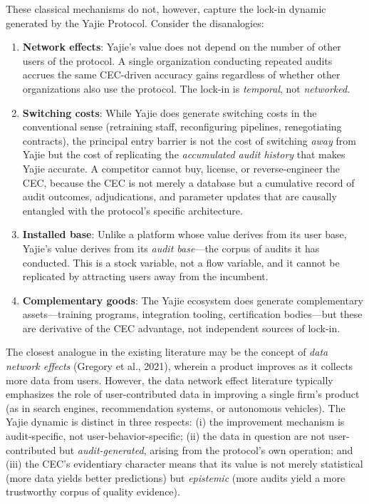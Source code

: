 \documentclass[12pt,a4paper]{article}
\theoremstyle{definition}
\theoremstyle{remark}
\begin{document}
These classical mechanisms do not, however, capture the lock-in dynamic generated by the Yajie Protocol. Consider the disanalogies:

\begin{enumerate}[label=\arabic*.]
\item \textbf{Network effects}: Yajie's value does not depend on the number of other users of the protocol. A single organization conducting repeated audits accrues the same CEC-driven accuracy gains regardless of whether other organizations also use the protocol. The lock-in is \textit{temporal}, not \textit{networked}.

\item \textbf{Switching costs}: While Yajie does generate switching costs in the conventional sense (retraining staff, reconfiguring pipelines, renegotiating contracts), the principal entry barrier is not the cost of switching \textit{away} from Yajie but the cost of replicating the \textit{accumulated audit history} that makes Yajie accurate. A competitor cannot buy, license, or reverse-engineer the CEC, because the CEC is not merely a database but a cumulative record of audit outcomes, adjudications, and parameter updates that are causally entangled with the protocol's specific architecture.

\item \textbf{Installed base}: Unlike a platform whose value derives from its user base, Yajie's value derives from its \textit{audit base}—the corpus of audits it has conducted. This is a stock variable, not a flow variable, and it cannot be replicated by attracting users away from the incumbent.

\item \textbf{Complementary goods}: The Yajie ecosystem does generate complementary assets—training programs, integration tooling, certification bodies—but these are derivative of the CEC advantage, not independent sources of lock-in.
\end{enumerate}

The closest analogue in the existing literature may be the concept of \textit{data network effects} (Gregory et al., 2021), wherein a product improves as it collects more data from users. However, the data network effect literature typically emphasizes the role of user-contributed data in improving a single firm's product (as in search engines, recommendation systems, or autonomous vehicles). The Yajie dynamic is distinct in three respects: (i) the improvement mechanism is audit-specific, not user-behavior-specific; (ii) the data in question are not user-contributed but \textit{audit-generated}, arising from the protocol's own operation; and (iii) the CEC's evidentiary character means that its value is not merely statistical (more data yields better predictions) but \textit{epistemic} (more audits yield a more trustworthy corpus of quality evidence).
\end{document}

